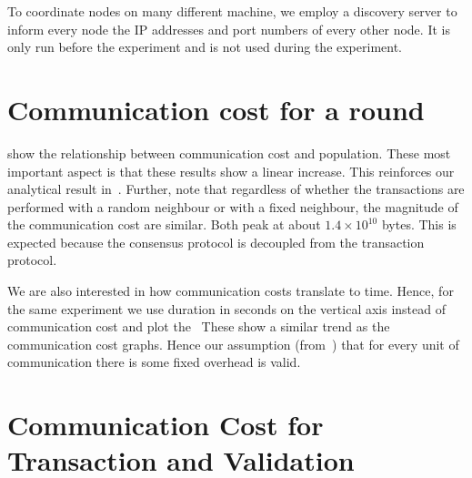 To coordinate nodes on many different machine,
we employ a discovery server to inform every node the IP addresses and port numbers of every other node.
It is only run before the experiment and is not used during the experiment.


\section{Communication cost for a round}

\begin{figure}[tb]
  \centering
\end{figure}

 show the relationship between communication cost and population.
These most important aspect is that these results show a linear increase.
This reinforces our analytical result in~.
Further, note that regardless of whether the transactions are performed with a random neighbour or with a fixed neighbour,
the magnitude of the communication cost are similar.
Both peak at about $1.4 \times 10^{10}$ bytes.
This is expected because the consensus protocol is decoupled from the transaction protocol.

We are also interested in how communication costs translate to time.
Hence, for the same experiment we use duration in seconds on the vertical axis instead of communication cost and plot the~
These show a similar trend as the communication cost graphs.
Hence our assumption (from~) that for every unit of communication there is some fixed overhead is valid.

\section{Communication Cost for Transaction and Validation}

